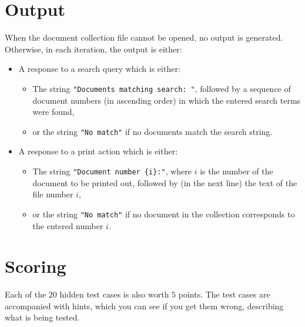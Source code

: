 \section*{Output}
When the document collection file cannot be opened, no output is generated. 
Otherwise, in each iteration, the output is either:
\begin{itemize}
    \item A response to a search query which is either:
    \begin{itemize}
        \item The string \texttt{"Documents matching search: "}, followed by a sequence of document numbers (in ascending order) in which the entered search terms were found,
        \item or the string \texttt{"No match"} if no documents match the search string. 
    \end{itemize}
    \item A response to a print action which is either:
    \begin{itemize}
        \item The string \texttt{"Document number \{i\}:"}, where $i$ is the number of the document to be printed out, followed by (in the next line) the text of the file number $i$, 
        \item or the string \texttt{"No match"} if no document in the collection corresponds to the entered number $i$.
    \end{itemize}
\end{itemize}

\section*{Scoring}
Each of the $20$ hidden test cases is also worth $5$ points.
The test cases are accompanied with hints, which you can see if you get them wrong, describing what is being tested.
